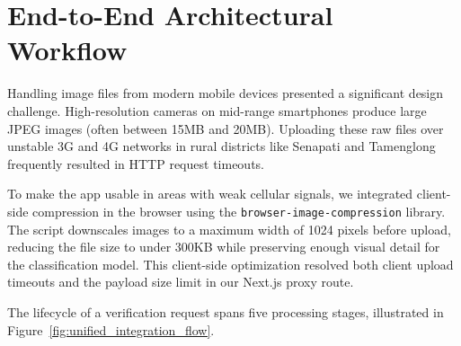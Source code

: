 \section{End-to-End Architectural Workflow}

Handling image files from modern mobile devices presented a significant design challenge. High-resolution cameras on mid-range smartphones produce large JPEG images (often between 15MB and 20MB). Uploading these raw files over unstable 3G and 4G networks in rural districts like Senapati and Tamenglong frequently resulted in HTTP request timeouts. 

To make the app usable in areas with weak cellular signals, we integrated client-side compression in the browser using the \texttt{browser-image-compression} library. The script downscales images to a maximum width of 1024 pixels before upload, reducing the file size to under 300KB while preserving enough visual detail for the classification model. This client-side optimization resolved both client upload timeouts and the payload size limit in our Next.js proxy route.

The lifecycle of a verification request spans five processing stages, illustrated in Figure~\ref{fig:unified_integration_flow}.

